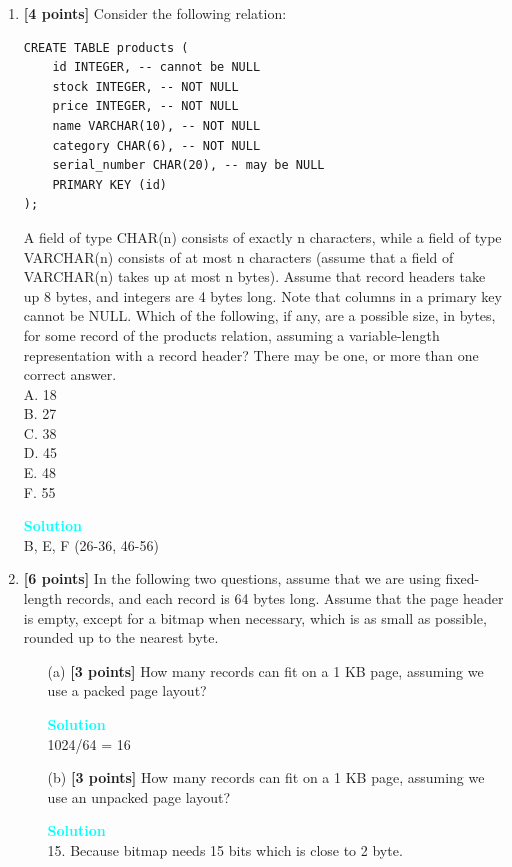 \documentclass[10pt]{article}
\newenvironment{solution}
    { \begin{mdframed}[backgroundcolor=gray!10] \textcolor{cyan}{\textbf{Solution}} \\}
    {  \end{mdframed}}
\begin{document}
\begin{enumerate}
\item \textbf{[4 points]}
Consider the following relation:
\begin{verbatim}
CREATE TABLE products (
	id INTEGER, -- cannot be NULL
	stock INTEGER, -- NOT NULL
	price INTEGER, -- NOT NULL
	name VARCHAR(10), -- NOT NULL
	category CHAR(6), -- NOT NULL
	serial_number CHAR(20), -- may be NULL
	PRIMARY KEY (id)
);
\end{verbatim}
A field of type CHAR(n) consists of exactly n characters, while a
field of type VARCHAR(n) consists of at most n characters (assume
that a field of VARCHAR(n) takes up at most n bytes). Assume that
record headers take up 8 bytes, and integers are 4 bytes long. Note
that columns in a primary key cannot be NULL. Which of the following, if any, are a possible size,
in bytes, for some record of the products relation, assuming a variable-length
representation with a record header? There may be one, or more
than one correct answer. \\
A. 18\\
B. 27\\
C. 38\\
D. 45\\
E. 48\\
F. 55\\
\begin{solution}
B, E, F (26-36, 46-56)
\end{solution}

\item \textbf{[6 points]}
In the following two questions, assume that we are using fixed-length
records, and each record is 64 bytes long. Assume that the page header
is empty, except for a bitmap when necessary, which is as small as
possible, rounded up to the nearest byte. 
\begin{itemize}
\item[(a)] \textbf{[3 points]} How many records can fit on a 1 KB page, assuming we
use a packed page layout?
\begin{solution}
1024/64 = 16
\end{solution}
\item[(b)] \textbf{[3 points]} How many records can fit on a 1 KB page, assuming we
use an unpacked page layout?
\begin{solution}
15. Because bitmap needs 15 bits which is close to 2 byte.
\end{solution}
\end{itemize}

\end{enumerate}
\end{document}

